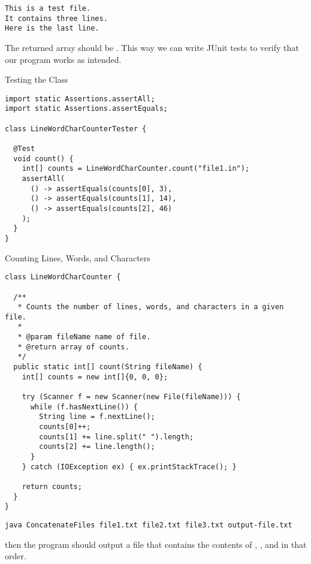 \begin{verbatim}
This is a test file.
It contains three lines.
Here is the last line.
\end{verbatim}
The returned array should be \ttt{[3, 14, 46]}. This way we can write JUnit tests to verify that our program works as intended.

\begin{cl}{Testing the  Class}
\begin{lstlisting}[language=MyJava]
import static Assertions.assertAll;
import static Assertions.assertEquals;

class LineWordCharCounterTester {

  @Test
  void count() {
    int[] counts = LineWordCharCounter.count("file1.in");
    assertAll(
      () -> assertEquals(counts[0], 3),
      () -> assertEquals(counts[1], 14),
      () -> assertEquals(counts[2], 46)
    );
  }
}
\end{lstlisting}
\end{cl}

\begin{cl}{Counting Lines, Words, and Characters}
\begin{lstlisting}[language=MyJava]
class LineWordCharCounter {

  /**
   * Counts the number of lines, words, and characters in a given file.
   *
   * @param fileName name of file.
   * @return array of counts.
   */
  public static int[] count(String fileName) {
    int[] counts = new int[]{0, 0, 0};

    try (Scanner f = new Scanner(new File(fileName))) {
      while (f.hasNextLine()) {
        String line = f.nextLine();
        counts[0]++;
        counts[1] += line.split(" ").length;
        counts[2] += line.length();
      }
    } catch (IOException ex) { ex.printStackTrace(); }

    return counts;
  }
}
\end{lstlisting}
\end{cl}

\begin{verbatim}
java ConcatenateFiles file1.txt file2.txt file3.txt output-file.txt
\end{verbatim}
then the program should output a file  that contains the contents of , , and  in that order. 

